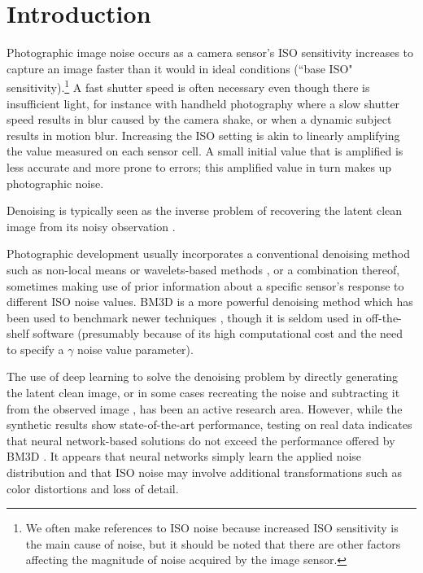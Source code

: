\chapter{Introduction}

Photographic image noise occurs as a camera sensor's ISO sensitivity increases to capture an image faster than it would in ideal conditions (``base ISO" sensitivity).\footnote{We often make references to ISO noise because increased ISO sensitivity is the main cause of noise, but it should be noted that there are other factors affecting the magnitude of noise acquired by the image sensor.} A fast shutter speed is often necessary even though there is insufficient light, for instance with handheld photography where a slow shutter speed results in blur caused by the camera shake, or when a dynamic subject results in motion blur. Increasing the ISO setting is akin to linearly amplifying the value measured on each sensor cell. A small initial value that is amplified is less accurate and more prone to errors; this amplified value in turn makes up photographic noise. 

Denoising is typically seen as the inverse problem of recovering the latent clean image from its noisy observation \cite{rednet}. 

Photographic development usually incorporates a conventional denoising method such as non-local means \cite{nlm} or wavelets-based methods \cite{wavelets-denoising}, or a combination thereof, sometimes making use of prior information about a specific sensor's response to different ISO noise values. \cite{darktable-denoising}
\ac{BM3D} is a more powerful denoising method which has been used to benchmark newer techniques \cite{all-bm3d-benchmarks}, though it is seldom used in off-the-shelf software (presumably because of its high computational cost and the need to specify a $\gamma$ noise value parameter). 

The use of deep learning to solve the denoising problem by directly generating the latent clean image, or in some cases recreating the noise and subtracting it from the observed image \cite{dncnn}, has been an active research area. However, while the synthetic results show state-of-the-art performance, testing on real data indicates that neural network-based solutions do not exceed the performance offered by \ac{BM3D} \cite{darmstadt}. It appears that neural networks simply learn the applied noise distribution and that ISO noise may involve additional transformations such as color distortions and loss of detail.

